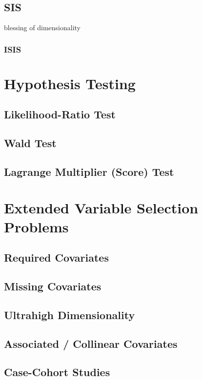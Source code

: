 \subsection{SIS}
blessing of dimensionality 
\subsubsection{ISIS}

\section{Hypothesis Testing}
\subsection{Likelihood-Ratio Test}
\subsection{Wald Test}
\subsection{Lagrange Multiplier (Score) Test}

\section{Extended Variable Selection Problems}
\subsection{Required Covariates}
\subsection{Missing Covariates}
\subsection{Ultrahigh Dimensionality}
\subsection{Associated / Collinear Covariates}
\subsection{Case-Cohort Studies}

\fi